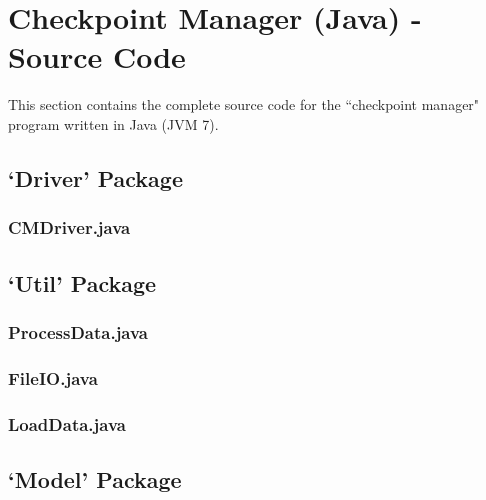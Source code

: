 \documentclass[a4paper, 10pt]{article}
\begin{document}


\clearpage
\section{Checkpoint Manager (Java) - Source Code}
This section contains the complete source code for the ``checkpoint manager" program written in Java (JVM 7).

\subsection{`Driver' Package}

\subsubsection{CMDriver.java}


\clearpage
\subsection{`Util' Package}

\subsubsection{ProcessData.java}


\clearpage
\subsubsection{FileIO.java}


\clearpage
\subsubsection{LoadData.java}


\clearpage
\subsection{`Model' Package}
\end{document}
